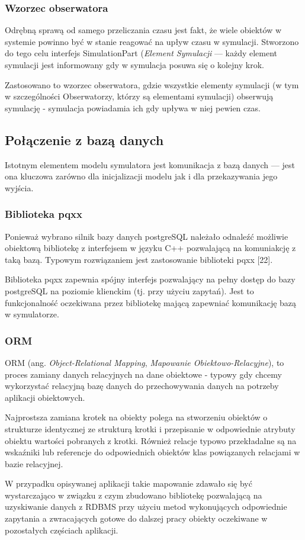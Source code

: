 {{{\subsubsection{Wzorzec obserwatora}
\par{
Odrębną sprawą od samego przeliczania czasu jest fakt, że wiele obiektów w systemie powinno być w stanie reagować na upływ czasu w symulacji. Stworzono do tego celu interfejs SimulationPart (\textit{Element Symulacji} --- każdy element symulacji jest informowany gdy w symulacja posuwa się o kolejny krok.
}
\par{
Zastosowano to wzorzec obserwatora, gdzie wszystkie elementy symulacji (w tym w szczególności Obserwatorzy, którzy są elementami symulacji) obserwują symulację - symulacja powiadamia ich gdy upływa w niej pewien czas.
}

\subsection{Połączenie z bazą danych}
\par{
Istotnym elementem modelu symulatora jest komunikacja z bazą danych --- jest ona kluczowa zarówno dla inicjalizacji modelu jak i dla przekazywania jego wyjścia.
}
\subsubsection{Biblioteka pqxx}
\par{
Ponieważ wybrano silnik bazy danych postgreSQL należało odnaleźć możliwie obiektową bibliotekę z interfejsem w języku C++ pozwalającą na komuniakcję z taką bazą. Typowym rozwiązaniem jest zastosowanie biblioteki pqxx [22].
}
\par{
Biblioteka pqxx zapewnia spójny interfejs pozwalający na pełny dostęp do bazy postgreSQL na poziomie klienckim (tj. przy użyciu zapytań). Jest to funkcjonalność oczekiwana przez bibliotekę mającą zapewniać komunikację bazą w symulatorze.
}
\subsubsection{ORM}
\par{
ORM (ang. \textit{Object-Relational Mapping}, \textit{Mapowanie Obiektowo-Relacyjne}), to proces zamiany danych relacyjnych na dane obiektowe - typowy gdy chcemy wykorzystać relacyjną bazę danych do przechowywania danych na potrzeby aplikacji obiektowych.
}
\par{
Najprostsza zamiana krotek na obiekty polega na stworzeniu obiektów o strukturze identycznej ze strukturą krotki i przepisanie w odpowiednie atrybuty obiektu wartości pobranych z krotki. Również relacje typowo przekładalne są na wskaźniki lub referencje do odpowiednich obiektów klas powiązanych relacjami w bazie relacyjnej.
}
\par{
W przypadku opisywanej aplikacji takie mapowanie zdawało się być wystarczająco w związku z czym zbudowano bibliotekę pozwalającą na uzyskiwanie danych z RDBMS przy użyciu metod wykonujących odpowiednie zapytania a zwracających gotowe do dalszej pracy obiekty oczekiwane w pozostałych częściach aplikacji.
}

}}}
